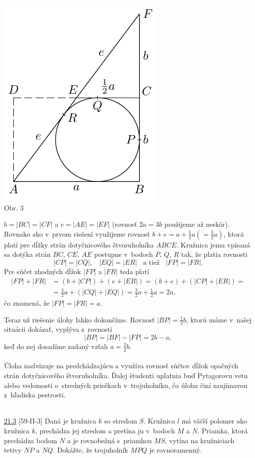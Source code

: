 \begin{center}
\includegraphics{obrazky/61K32}\\

Obr. 3
\end{center}
$b = |BC| = |CF|$ a $e = |AE| = |EF|$ (rovnosť $2a = 3b$ použijeme až neskôr). Rovnako ako v~prvom riešení využijeme rovnosť $b+e = a+\frac{1}{2}a (=\frac{3}{2}a)$, ktorá platí pre dĺžky strán dotyčnicového štvoruholníka $ABCE$. Kružnica jemu vpísaná sa dotýka strán $BC$, $CE$, $AE$ postupne v~bodoch $P$, $Q$, $R$ tak, že platia rovnosti
$$|CP| = |CQ|, \ \ \ \ |EQ| = |ER| \ \ \ \ \text{a tiež}\ \ \ \ |FP| = |FR|.$$
Pre súčet zhodných dĺžok $|FP|$ a $|FR|$ teda platí
\begin{align*}
|FP| + |FR| &= (b + |CP|) + (e + |ER|) = (b + e) + (|CP| + |ER|) =\\
&=\frac{3}{2}a + (|CQ| + |EQ|) = \frac{3}{2}a + \frac{1}{2}a = 2a,
\end{align*}
čo znamená, že $|FP| = |FR| = a$.

Teraz už riešenie úlohy ľahko dokončíme. Rovnosť $|BP| =\frac{1}{2}b$, ktorú máme v~našej situácii dokázať, vyplýva z~rovnosti
$$|BP| = |BF| - |FP| = 2b -a,$$
keď do nej dosadíme zadaný vzťah $a=\frac{3}{2}b$.\\
\\
\kom Úloha nadväzuje na predchádzajúcu a využíva rovnosť súčtov dĺžok opačných strán dotyčnicového štvoruholníka. Ďalej študenti uplatnia buď Pytagorovu vetu alebo vedomosti o~stredných priečkach v~trojuholníku, čo úlohu činí zaujímavou z~hľadiska pestrosti.\\
\\
\begin{tcolorbox}[breakable,notitle,boxrule=0pt,colback=light-gray,colframe=light-gray]\ul{21.3} [59-II-3]  Daná je kružnica $k$ so stredom $S$. Kružnica $l$ má väčší polomer ako kružnica $k$, prechádza jej stredom a pretína ju v~bodoch $M$ a $N$. Priamka, ktorá prechádza bodom $N$ a je rovnobežná s~priamkou $MS$, vytína na kružniciach tetivy $NP$ a $NQ$. Dokážte, že trojuholník $MPQ$ je rovnoramenný.

\end{tcolorbox}

